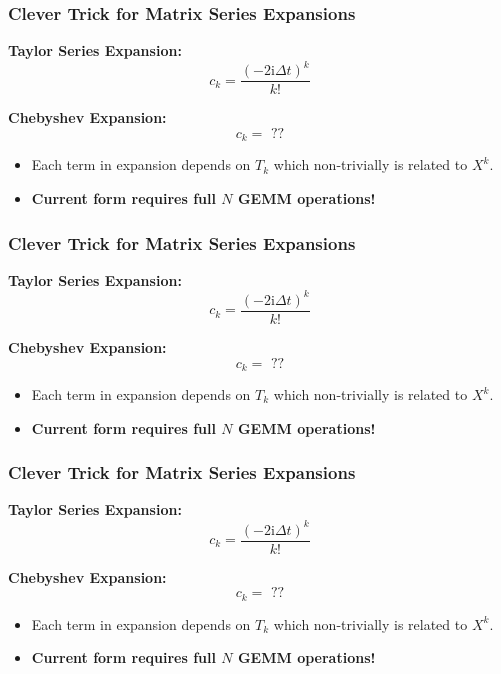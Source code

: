 \documentclass{beamer}
\begin{document}
\begin{frame}
\frametitle{Clever Trick for Matrix Series Expansions}

\textbf{Taylor Series Expansion:}
\begin{equation*}
c_k = \frac{(-2\mathrm{i}\Delta t)^k}{k!}
\end{equation*}

\textbf{Chebyshev Expansion:}
\begin{equation*}
c_k = \text{ ??}
\end{equation*}
\begin{itemize}
  \color{white}
  \item[\color{white}] Each term in expansion depends on $T_k$ which non-trivially is related to $X^k$.
  \item[\color{white}] \bf Current form requires full $N$ GEMM operations!
\end{itemize}
\end{frame}

\begin{frame}
\frametitle{Clever Trick for Matrix Series Expansions}

\textbf{Taylor Series Expansion:}
\begin{equation*}
c_k = \frac{(-2\mathrm{i}\Delta t)^k}{k!}
\end{equation*}

\textbf{Chebyshev Expansion:}
\begin{equation*}
c_k = \text{ ??}
\end{equation*}
\begin{itemize}
  \item Each term in expansion depends on $T_k$ which non-trivially is related to $X^k$.
  \color{white}
  \item[\color{white}] \bf Current form requires full $N$ GEMM operations!
\end{itemize}
\end{frame}

\begin{frame}
\frametitle{Clever Trick for Matrix Series Expansions}

\textbf{Taylor Series Expansion:}
\begin{equation*}
c_k = \frac{(-2\mathrm{i}\Delta t)^k}{k!}
\end{equation*}

\textbf{Chebyshev Expansion:}
\begin{equation*}
c_k = \text{ ??}
\end{equation*}
\begin{itemize}
  \item Each term in expansion depends on $T_k$ which non-trivially is related to $X^k$.
  \item \bf Current form requires full $N$ GEMM operations!
\end{itemize}
\end{frame}
\end{document}
